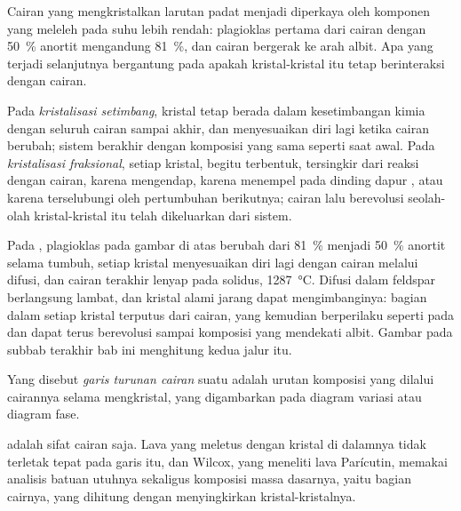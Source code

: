 Cairan yang mengkristalkan larutan padat menjadi diperkaya oleh komponen yang
meleleh pada suhu lebih rendah: plagioklas pertama dari cairan dengan
\qty{50}{\percent} anortit mengandung \qty{81}{\percent}, dan cairan bergerak ke arah
albit. Apa yang terjadi selanjutnya bergantung pada apakah kristal-kristal itu tetap berinteraksi dengan
cairan.

\begin{definition}
\label{def:b2:magmatic-differentiation:crystallisation}
Pada \emph{kristalisasi setimbang},
kristal tetap berada dalam kesetimbangan kimia dengan seluruh cairan sampai
akhir, dan menyesuaikan diri lagi ketika cairan berubah; sistem berakhir dengan komposisi
yang sama seperti saat awal. Pada \emph{kristalisasi fraksional},
setiap kristal, begitu terbentuk, tersingkir dari reaksi dengan
cairan, karena mengendap, karena menempel pada dinding dapur , atau karena
terselubungi oleh pertumbuhan berikutnya; cairan lalu berevolusi seolah-olah kristal-kristal itu telah
dikeluarkan dari sistem.
\end{definition}

Pada , plagioklas pada gambar di atas berubah dari
\qty{81}{\percent} menjadi \qty{50}{\percent} anortit selama tumbuh, setiap kristal
menyesuaikan diri lagi dengan cairan melalui difusi, dan cairan terakhir lenyap pada
solidus, \qty{1287}{\celsius}. Difusi dalam feldspar berlangsung lambat, dan kristal
alami jarang dapat mengimbanginya: bagian dalam setiap kristal terputus dari cairan,
yang kemudian berperilaku seperti pada  dan dapat terus berevolusi sampai komposisi
yang mendekati albit. Gambar pada subbab terakhir bab ini menghitung kedua jalur itu.

\begin{definition}\label{def:b2:magmatic-differentiation:lld}
Yang disebut \emph{garis turunan cairan} suatu  adalah
urutan komposisi yang dilalui cairannya selama mengkristal, yang digambarkan pada
diagram variasi atau diagram fase.
\end{definition}

 adalah sifat cairan saja. Lava yang meletus dengan
kristal di dalamnya tidak terletak tepat pada garis itu, dan Wilcox, yang meneliti lava
Parícutin, memakai analisis batuan utuhnya sekaligus komposisi
massa dasarnya, yaitu bagian cairnya, yang dihitung dengan menyingkirkan kristal-kristalnya.

